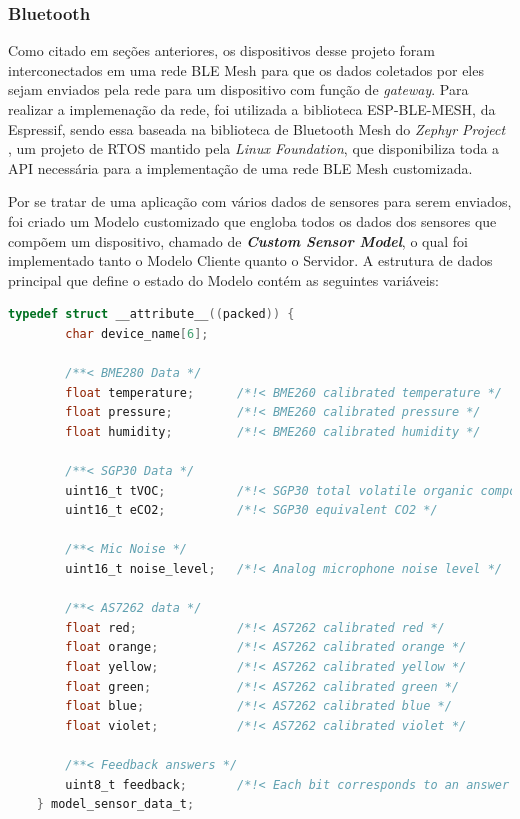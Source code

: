 \documentclass[../monografia.tex]{subfiles}
\begin{document}
\subsubsection{Bluetooth} \label{dev-bluetooth-section}

Como citado em seções anteriores, os dispositivos desse projeto foram interconectados em uma rede BLE Mesh para que os dados coletados por eles sejam enviados pela rede para um dispositivo com função de \textit{gateway}. Para realizar a implemenação da rede, foi utilizada a biblioteca ESP-BLE-MESH, da Espressif, sendo essa baseada na biblioteca de Bluetooth Mesh do \textit{Zephyr Project} \cite{zephyrproject}, um projeto de RTOS mantido pela \textit{Linux Foundation}, que disponibiliza toda a API necessária para a implementação de uma rede BLE Mesh customizada.

Por se tratar de uma aplicação com vários dados de sensores para serem enviados, foi criado um Modelo customizado que engloba todos os dados dos sensores que compõem um dispositivo, chamado de \textit{\textbf{Custom Sensor Model}}, o qual foi implementado tanto o Modelo Cliente quanto o Servidor. A estrutura de dados principal que define o estado do Modelo contém as seguintes variáveis: 

\begin{lstlisting}[basicstyle=\tiny,language=C,]
	typedef struct __attribute__((packed)) {
		char device_name[6];
		
		/**< BME280 Data */
		float temperature;      /*!< BME260 calibrated temperature */
		float pressure;         /*!< BME260 calibrated pressure */
		float humidity;         /*!< BME260 calibrated humidity */
	
		/**< SGP30 Data */
		uint16_t tVOC;          /*!< SGP30 total volatile organic compound */
		uint16_t eCO2;          /*!< SGP30 equivalent CO2 */
	
		/**< Mic Noise */
		uint16_t noise_level;   /*!< Analog microphone noise level */
	
		/**< AS7262 data */
		float red;              /*!< AS7262 calibrated red */
		float orange;           /*!< AS7262 calibrated orange */
		float yellow;           /*!< AS7262 calibrated yellow */
		float green;            /*!< AS7262 calibrated green */
		float blue;             /*!< AS7262 calibrated blue */
		float violet;           /*!< AS7262 calibrated violet */
	
		/**< Feedback answers */
		uint8_t feedback;       /*!< Each bit corresponds to an answer */
	} model_sensor_data_t; 
\end{lstlisting}
\end{document}
